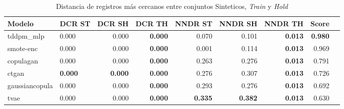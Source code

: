 \begin{table}[H]
\centering
\caption{Distancia de registros más cercanos entre conjuntos Sinteticos, \emph{Train} y \emph{Hold}}
\label{table-dcr-economicos-a-2}
\begin{tabular}{|l|l|r|r|r|r|r|r|r|}
\hline
\rowcolor[gray]{0.8}
Modelo & DCR ST & DCR SH & DCR TH & NNDR ST & NNDR SH & NNDR TH & \textbf{Score} \\
\hline tddpm\_mlp & 0.000 & \cellcolor[rgb]{0.9, 0.54, 0.52} 0.000 & \bfseries 0.000 & 0.070 & 0.101 & \bfseries 0.013 & \bfseries 0.980 \\
\hline smote-enc & \cellcolor[rgb]{0.9, 0.54, 0.52} 0.000 & 0.000 & \bfseries 0.000 & 0.001 & 0.114 & \bfseries 0.013 & 0.969 \\
\hline copulagan & 0.000 & 0.000 & \bfseries 0.000 & 0.263 & 0.276 & \bfseries 0.013 & 0.791 \\
\hline ctgan & \bfseries 0.000 & \bfseries 0.000 & \bfseries 0.000 & 0.276 & 0.307 & \bfseries 0.013 & 0.726 \\
\hline gaussiancopula & 0.000 & 0.000 & \bfseries 0.000 & 0.293 & 0.276 & \bfseries 0.013 & 0.692 \\
\hline tvae & 0.000 & 0.000 & \bfseries 0.000 & \bfseries 0.335 & \bfseries 0.382 & \bfseries 0.013 & 0.630 \\
\hline
\end{tabular}
\end{table}
